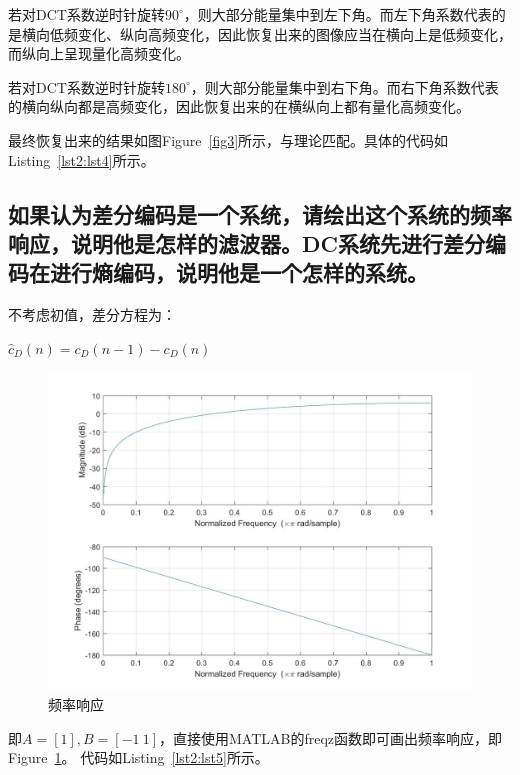 \documentclass[a4paper]{article}
\begin{document}
		若对DCT系数逆时针旋转$90^\circ$，则大部分能量集中到左下角。而左下角系数代表的是横向低频变化、纵向高频变化，因此恢复出来的图像应当在横向上是低频变化，而纵向上呈现量化高频变化。
		
		若对DCT系数逆时针旋转$180^\circ$，则大部分能量集中到右下角。而右下角系数代表的横向纵向都是高频变化，因此恢复出来的在横纵向上都有量化高频变化。
		
		最终恢复出来的结果如图Figure~\ref{fig3}所示，与理论匹配。具体的代码如Listing~\ref{lst2:lst4}所示。
		
		
		
		\subsection{如果认为差分编码是一个系统，请绘出这个系统的频率响应，说明他是怎样的滤波器。DC系统先进行差分编码在进行熵编码，说明他是一个怎样的系统。}
		
		不考虑初值，差分方程为：
		\begin{center}
			$ \hat{c}_{D}(n) = c_{D}(n-1) - c_{D}(n) $
		\end{center}
		
		\begin{figure}[H]
			\centering
			\includegraphics[width = .55\textwidth]{../source/3.2/frequency_plot.jpg}
			\caption{频率响应}
			\label{fig4}
		\end{figure}
		
		即$ A = [1], B = [-1\ 1] $，直接使用MATLAB的freqz函数即可画出频率响应，即Figure~\ref{fig4}。
		代码如Listing~\ref{lst2:lst5}所示。
		
		
		
\end{document}
